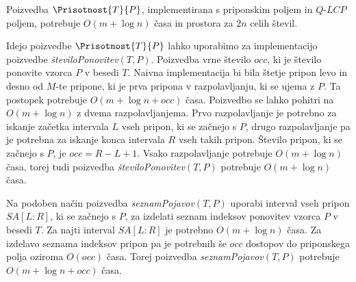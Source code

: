 \begin{izr}\label{izr:LCP}
    Poizvedba $\Prisotnost{T}{P}$, implementirana s priponskim poljem in $\textit{Q-LCP}$ poljem, potrebuje $O(m+\log{n})$ časa in prostora za $2n$ celih števil.
\end{izr}





Idejo poizvedbe $\Prisotnost{T}{P}$ lahko uporabimo za implementacijo poizvedbe \textit{številoPonovitev}$(T,P)$. Poizvedba vrne število $occ$, ki je število ponovite vzorca $P$ v besedi $T$. Naivna implementacija bi bila štetje pripon levo in desno od $M$-te pripone, ki je prva pripona v razpolavljanju, ki se ujema z $P$. Ta postopek potrebuje $O(m + \log{n}+occ)$ časa. Poizvedbo se lahko pohitri na $O(m + \log{n})$ z dvema razpolavljanjema. Prvo razpolavljanje je potrebno za iskanje začetka intervala $L$ vseh pripon, ki se začnejo s $P$, drugo razpolavljanje pa je potrebna za iskanje konca intervala $R$ vseh takih pripon. Število pripon, ki se začnejo s $P$, je $occ=R-L+1$. Vsako razpolavljanje potrebuje $O(m+\log{n})$ časa, torej tudi poizvedba \textit{številoPonovitev}$(T,P)$ potrebuje $O(m+\log{n})$ časa.

Na podoben način poizvedba \textit{seznamPojavov}$(T,P)$ uporabi interval vseh pripon $SA[L:R]$, ki se začnejo s $P$, za izdelati seznam indeksov ponovitev vzorca $P$ v besedi $T$. Za najti interval $SA[L:R]$ je potrebno $O(m+\log{n})$ časa. Za izdelavo seznama indeksov pripon pa je potrebnih še $occ$ dostopov do priponskega polja oziroma $O(occ)$ časa. Torej poizvedba \textit{seznamPojavov}$(T,P)$ potrebuje $O(m+\log{n}+occ)$ časa.


